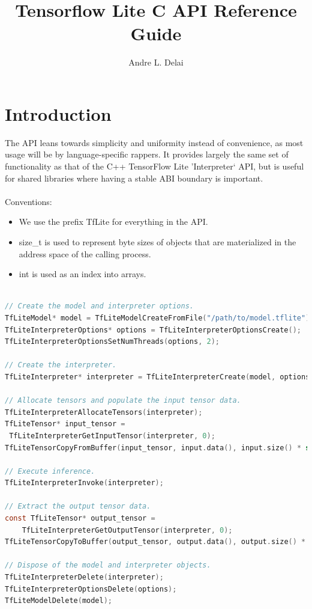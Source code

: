 \documentclass{ol-softwaremanual}
\title{Tensorflow Lite C API Reference Guide}
\author{Andre L. Delai}
\begin{document}
\maketitle
\tableofcontents
\listoflistings
\newpage

\section{Introduction}

The API leans towards simplicity and uniformity instead of convenience, as most usage will be by language-specific rappers. It provides largely the same set of functionality as that of the C++ TensorFlow Lite 'Interpreter` API, but is useful for shared libraries where having a stable ABI boundary is important.\\\\
Conventions:
 \begin{itemize}
    \item  We use the prefix TfLite for everything in the API.
    \item size\_t is used to represent byte sizes of objects that are materialized in the address space of the calling process.
    \item int is used as an index into arrays. 
\end{itemize}

\begin{lstlisting}[language=C, caption=Usage, basicstyle=\ttfamily\small, frame = single, breaklines]

// Create the model and interpreter options.
TfLiteModel* model = TfLiteModelCreateFromFile("/path/to/model.tflite");
TfLiteInterpreterOptions* options = TfLiteInterpreterOptionsCreate();
TfLiteInterpreterOptionsSetNumThreads(options, 2);

// Create the interpreter.
TfLiteInterpreter* interpreter = TfLiteInterpreterCreate(model, options);

// Allocate tensors and populate the input tensor data.
TfLiteInterpreterAllocateTensors(interpreter);
TfLiteTensor* input_tensor = 
 TfLiteInterpreterGetInputTensor(interpreter, 0);
TfLiteTensorCopyFromBuffer(input_tensor, input.data(), input.size() * sizeof(float));

// Execute inference.
TfLiteInterpreterInvoke(interpreter);

// Extract the output tensor data.
const TfLiteTensor* output_tensor =
    TfLiteInterpreterGetOutputTensor(interpreter, 0);
TfLiteTensorCopyToBuffer(output_tensor, output.data(), output.size() * sizeof(float));

// Dispose of the model and interpreter objects.
TfLiteInterpreterDelete(interpreter);
TfLiteInterpreterOptionsDelete(options);
TfLiteModelDelete(model);
\end{lstlisting}
 
\end{document}
